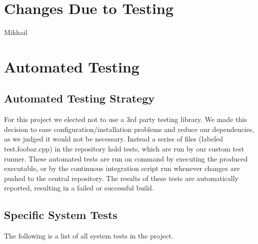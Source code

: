 \documentclass[12pt, titlepage]{article}
\begin{document}
\section{Changes Due to Testing}
	Mikhail

\section{Automated Testing}

\subsection{Automated Testing Strategy}
For this project we elected not to use a 3rd party testing library. We made this decision to ease configuration/installation problems and reduce our dependencies, as we judged it would not be necessary. Instead a series of files (labeled test.foobar.cpp) in the repository hold tests, which are run by our custom test runner. These automated tests are run on command by executing the produced executable, or by the continuous integration script run whenever changes are pushed to the central repository. The results of these tests are automatically reported, resulting in a failed or successful build.

\subsection{Specific System Tests}
The following is a list of all system tests in the project.
\end{document}
